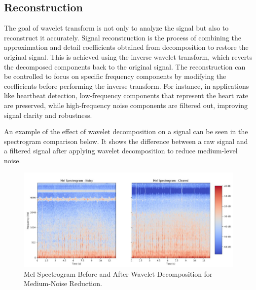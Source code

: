 \documentclass[conference]{IEEEtran}
\begin{document}
\subsection{Reconstruction} The goal of wavelet transform is not only to analyze the signal but also to reconstruct it accurately. Signal reconstruction is the process of combining the approximation and detail coefficients obtained from decomposition to restore the original signal. This is achieved using the inverse wavelet transform, which reverts the decomposed components back to the original signal. The reconstruction can be controlled to focus on specific frequency components by modifying the coefficients before performing the inverse transform. For instance, in applications like heartbeat detection, low-frequency components that represent the heart rate are preserved, while high-frequency noise components are filtered out, improving signal clarity and robustness.

An example of the effect of wavelet decomposition on a signal can be seen in the spectrogram comparison below. It shows the difference between a raw signal and a filtered signal after applying wavelet decomposition to reduce medium-level noise.

\begin{figure}[h] \centering \includegraphics[width=0.8\linewidth]{Images/medium-noise mel spectrogram.png} \caption{Mel Spectrogram Before and After Wavelet Decomposition for Medium-Noise Reduction.} \label{fig:medium mel comparison} \end{figure}

\end{document}
